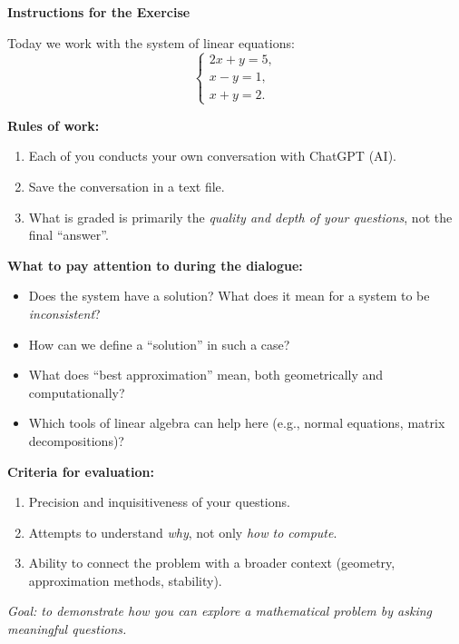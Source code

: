 \documentclass[12pt,a4paper]{article}
\begin{document}
\begin{center}
\Large \textbf{Instructions for the Exercise}
\end{center}

\bigskip

\noindent
Today we work with the system of linear equations:
\[
\begin{cases}
2x + y = 5, \\
x - y = 1, \\
x + y = 2.
\end{cases}
\]

\bigskip

\textbf{Rules of work:}
\begin{enumerate}
    \item Each of you conducts your own conversation with ChatGPT (AI).
    \item Save the conversation in a text file.
    \item What is graded is primarily the \emph{quality and depth of your questions}, not the final “answer”.
\end{enumerate}

\bigskip

\textbf{What to pay attention to during the dialogue:}
\begin{itemize}
    \item Does the system have a solution? What does it mean for a system to be \emph{inconsistent}?
    \item How can we define a “solution” in such a case?
    \item What does “best approximation” mean, both geometrically and computationally?
    \item Which tools of linear algebra can help here (e.g., normal equations, matrix decompositions)?
\end{itemize}

\bigskip

\textbf{Criteria for evaluation:}
\begin{enumerate}
    \item Precision and inquisitiveness of your questions.
    \item Attempts to understand \emph{why}, not only \emph{how to compute}.
    \item Ability to connect the problem with a broader context (geometry, approximation methods, stability).
\end{enumerate}

\bigskip

\textit{Goal: to demonstrate how you can explore a mathematical problem by asking meaningful questions.}
\end{document}
